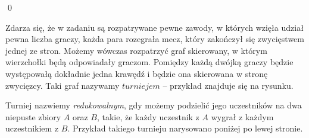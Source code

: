 \qed


\noindent
Zdarza się, że w zadaniu są rozpatrywane pewne zawody, w których wzięła udział pewna liczba graczy, każda para rozegrała mecz, który zakończył się zwycięstwem jednej ze stron. Możemy wówczas rozpatrzyć graf skierowany, w którym wierzchołki będą odpowiadały graczom. Pomiędzy każdą dwójką graczy będzie występowałą dokładnie jedna krawędź i będzie ona skierowana w stronę zwycięzcy. Taki graf nazywamy $\textit{turniejem}$ -- przykład znajduje się na rysunku.

\begin{center}
\end{center}

\noindent
Turniej nazwiemy \textit{redukowalnym}, gdy możemy podzielić jego uczestników na dwa niepuste zbiory $A$ oraz $B$, takie, że każdy uczestnik z $A$ wygrał z każdym uczestnikiem z $B$. Przykład takiego turnieju narysowano poniżej po lewej stronie.

